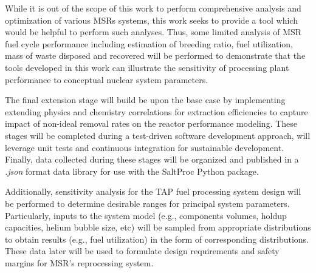 While it is out of the scope of this work to perform comprehensive 
analysis and optimization of various \glspl{MSR} systems, this 
work seeks to provide a tool which would be helpful to perform such 
analyses. Thus, some limited analysis of \gls{MSR} fuel cycle 
performance including estimation of breeding ratio, fuel utilization, 
mass of waste disposed and recovered will be performed to demonstrate 
that the tools developed in this work can illustrate the sensitivity 
of processing plant performance to conceptual nuclear system parameters.


The final extension stage will build be upon the base case by 
implementing extending physics and chemistry correlations for 
extraction efficiencies to capture impact of non-ideal 
removal rates on the reactor performance modeling. These 
stages will be completed during a test-driven software 
development approach, will leverage unit tests and 
continuous integration for sustainable development. Finally, 
data collected during these stages will be organized and 
published in a \textit{.json} format data library for use 
with the SaltProc Python package.

Additionally, sensitivity analysis for the \gls{TAP} fuel processing 
system design will be performed to determine desirable ranges 
for principal system parameters. Particularly, inputs to the 
system model (e.g., components volumes, holdup capacities, helium 
bubble size, etc) will be sampled from appropriate 
distributions to obtain results (e.g., fuel utilization) in the 
form of corresponding distributions. These data later will be used
to formulate design requirements and safety margins for 
\gls{MSR}'s reprocessing system.